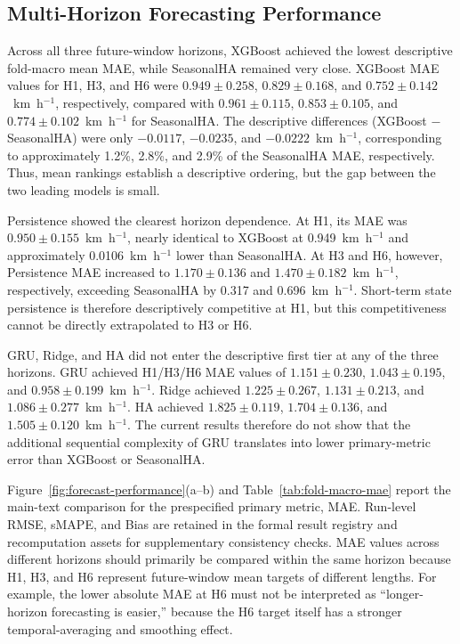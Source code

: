 \documentclass[pdflatex,sn-mathphys-num,iicol]{sn-jnl}
\begin{document}

\subsection{Multi-Horizon Forecasting Performance}
\label{subsec:multi-horizon-performance}

Across all three future-window horizons, XGBoost achieved the lowest descriptive fold-macro mean MAE, while SeasonalHA remained very close. XGBoost MAE values for H1, H3, and H6 were $0.949 \pm 0.258$, $0.829 \pm 0.168$, and $0.752 \pm 0.142$~km~h$^{-1}$, respectively, compared with $0.961 \pm 0.115$, $0.853 \pm 0.105$, and $0.774 \pm 0.102$~km~h$^{-1}$ for SeasonalHA. The descriptive differences (XGBoost $-$ SeasonalHA) were only $-0.0117$, $-0.0235$, and $-0.0222$~km~h$^{-1}$, corresponding to approximately 1.2\%, 2.8\%, and 2.9\% of the SeasonalHA MAE, respectively. Thus, mean rankings establish a descriptive ordering, but the gap between the two leading models is small.

Persistence showed the clearest horizon dependence. At H1, its MAE was $0.950 \pm 0.155$~km~h$^{-1}$, nearly identical to XGBoost at 0.949~km~h$^{-1}$ and approximately 0.0106~km~h$^{-1}$ lower than SeasonalHA. At H3 and H6, however, Persistence MAE increased to $1.170 \pm 0.136$ and $1.470 \pm 0.182$~km~h$^{-1}$, respectively, exceeding SeasonalHA by 0.317 and 0.696~km~h$^{-1}$. Short-term state persistence is therefore descriptively competitive at H1, but this competitiveness cannot be directly extrapolated to H3 or H6.

GRU, Ridge, and HA did not enter the descriptive first tier at any of the three horizons. GRU achieved H1/H3/H6 MAE values of $1.151 \pm 0.230$, $1.043 \pm 0.195$, and $0.958 \pm 0.199$~km~h$^{-1}$. Ridge achieved $1.225 \pm 0.267$, $1.131 \pm 0.213$, and $1.086 \pm 0.277$~km~h$^{-1}$. HA achieved $1.825 \pm 0.119$, $1.704 \pm 0.136$, and $1.505 \pm 0.120$~km~h$^{-1}$. The current results therefore do not show that the additional sequential complexity of GRU translates into lower primary-metric error than XGBoost or SeasonalHA.

Figure~\ref{fig:forecast-performance}(a--b) and Table~\ref{tab:fold-macro-mae} report the main-text comparison for the prespecified primary metric, MAE. Run-level RMSE, sMAPE, and Bias are retained in the formal result registry and recomputation assets for supplementary consistency checks. MAE values across different horizons should primarily be compared within the same horizon because H1, H3, and H6 represent future-window mean targets of different lengths. For example, the lower absolute MAE at H6 must not be interpreted as ``longer-horizon forecasting is easier,'' because the H6 target itself has a stronger temporal-averaging and smoothing effect.
\end{document}
